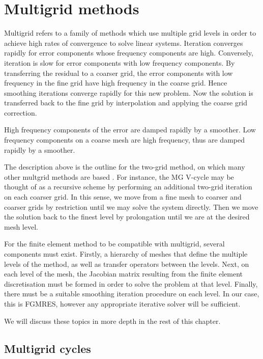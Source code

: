 \section{Multigrid methods}

Multigrid refers to a family of methods which use multiple grid levels in order to achieve high rates of convergence to solve linear systems.
Iteration converges rapidly for error components whose frequency components are high.
Conversely, iteration is slow for error components with low frequency components.
By transferring the residual to a coarser grid, the error components with low frequency in the fine grid have high frequency in the coarse grid.
Hence smoothing iterations converge rapidly for this new problem.
Now the solution is transferred back to the fine grid by interpolation and applying the coarse grid correction.

High frequency components of the error are damped rapidly by a smoother.
Low frequency components on a coarse mesh are high frequency, thus are damped rapidly by a smoother.

The description above is the outline for the two-grid method, on which many other multgrid methods are based \cite{hackbusch}.
For instance, the MG V-cycle may be thought of as a recursive scheme by performing an additional two-grid iteration on each coarser grid.
In this sense, we move from a fine mesh to coarser and coarser grids by restriction until we may solve the system directly.
Then we move the solution back to the finest level by prolongation until we are at the desired mesh level. 

For the finite element method to be compatible with multigrid, several components must exist.
Firstly, a hierarchy of meshes that define the multiple levels of the method, as well as transfer operators between the levels.
Next, on each level of the mesh, the Jacobian matrix resulting from the finite element discretisation must be formed in order to solve the problem at that level.
Finally, there must be  a suitable smoothing iteration procedure on each level.
In our case, this is FGMRES, however any appropriate iterative solver will be sufficient.

We will discuss these topics in more depth in the rest of this chapter.






\subsection{Multigrid cycles}

